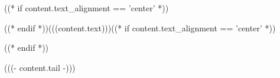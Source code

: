 \noindent ((* if content.text_alignment == 'center' *)){\setlength\topsep{0pt}\setlength\parskip{0pt}\begin{center}((* endif *))(((content.text)))((* if content.text_alignment == 'center' *))\end{center}}((* endif *))\par (((- content.tail -)))